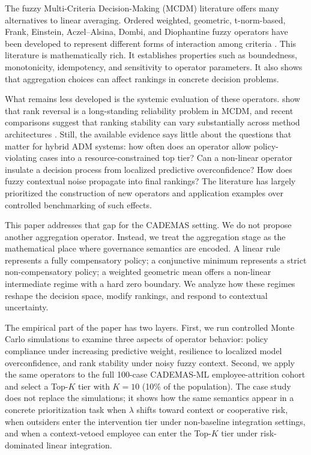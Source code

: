\documentclass[mathematics,article,submit,moreauthors]{Definitions/mdpi}
\begin{document}
The fuzzy Multi-Criteria Decision-Making (MCDM) literature offers many alternatives to linear averaging. Ordered weighted, geometric, t-norm-based, Frank, Einstein, Aczel--Alsina, Dombi, and Diophantine fuzzy operators have been developed to represent different forms of interaction among criteria \citep{Yager1988,Grabisch1996,Tan2009,Mahmood2022,Iampan2021,Riaz2021,Riaz2022,Riaz2021a,Jeevitha2023}. This literature is mathematically rich. It establishes properties such as boundedness, monotonicity, idempotency, and sensitivity to operator parameters. It also shows that aggregation choices can affect rankings in concrete decision problems.

What remains less developed is the systemic evaluation of these operators. \citet{Aires2018} show that rank reversal is a long-standing reliability problem in MCDM, and recent comparisons suggest that ranking stability can vary substantially across method architectures \citep{Amman2025,Kizielewicz2025}. Still, the available evidence says little about the questions that matter for hybrid ADM systems: how often does an operator allow policy-violating cases into a resource-constrained top tier? Can a non-linear operator insulate a decision process from localized predictive overconfidence? How does fuzzy contextual noise propagate into final rankings? The literature has largely prioritized the construction of new operators and application examples over controlled benchmarking of such effects.

This paper addresses that gap for the CADEMAS setting. We do not propose another aggregation operator. Instead, we treat the aggregation stage as the mathematical place where governance semantics are encoded. A linear rule represents a fully compensatory policy; a conjunctive minimum represents a strict non-compensatory policy; a weighted geometric mean offers a non-linear intermediate regime with a hard zero boundary. We analyze how these regimes reshape the decision space, modify rankings, and respond to contextual uncertainty.

The empirical part of the paper has two layers. First, we run controlled Monte Carlo simulations to examine three aspects of operator behavior: policy compliance under increasing predictive weight, resilience to localized model overconfidence, and rank stability under noisy fuzzy context. Second, we apply the same operators to the full 100-case CADEMAS-ML employee-attrition cohort and select a Top-$K$ tier with $K = 10$ (10\% of the population). The case study does not replace the simulations; it shows how the same semantics appear in a concrete prioritization task when $\lambda$ shifts toward context or cooperative risk, when outsiders enter the intervention tier under non-baseline integration settings, and when a context-vetoed employee can enter the Top-$K$ tier under risk-dominated linear integration.
\end{document}
